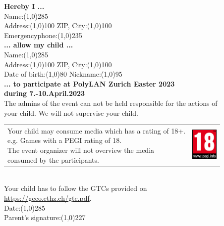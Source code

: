 \documentclass{article}
\begin{document}
\textbf{Hereby I ...}\\
\vspace{0.5cm}
Name:\line(1,0){285}\\
\vspace{0.5cm}
Address:\line(1,0){100}\hspace{1cm} ZIP, City:\line(1,0){100}\\
\vspace{0.5cm}
Emergencyphone:\line(1,0){235} \\
\vspace{0.5cm}
\textbf{... allow my child ...}\\
\vspace{0.5cm}
Name:\line(1,0){285}\\
\vspace{0.5cm}
Address:\line(1,0){100}\hspace{1cm} ZIP, City:\line(1,0){100}\\
\vspace{0.5cm}
Date of birth:\line(1,0){80}\hspace{1cm} Nickname:\line(1,0){95}\\
\vspace{0.5cm}
\textbf{... to participate at PolyLAN Zurich Easter 2023\\during 7.-10.April.2023}\\
\vspace{0.5cm}
The admins of the event can not be held responsible for the actions of\\your child.
We will not supervise your child.\\
\vspace{0.2cm}
\begin{tabular}{@{}l l@{}}
\shortstack[l]{Your child may consume media which has a rating of 18+. \\e.g. Games with a PEGI rating of 18.\\The event organizer will not overview the media\\ consumed by the participants.} & \includegraphics[width=1.3cm]{img/pegi18.png}
\end{tabular}
\vspace{0.5cm}
\\
Your child has to follow the GTCs provided on\\\url{https://geco.ethz.ch/gtc.pdf}.
\vspace{1cm}
\\
Date:\line(1,0){285} \\
\vspace{0.5cm}
Parent's signature:\line(1,0){227} \\

\end{document}
